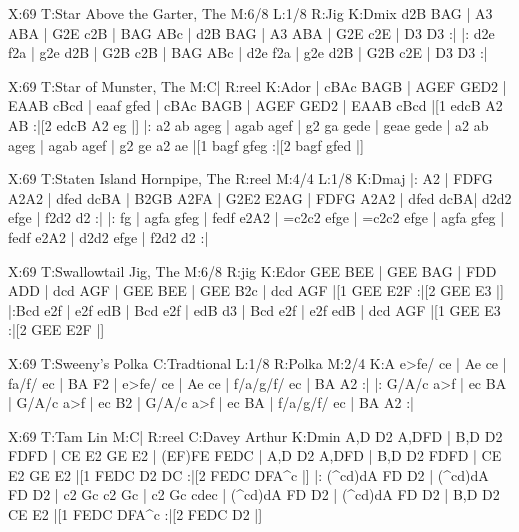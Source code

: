 \documentclass[letterpaper]{article}
\begin{document}
\begin{abc}[name]
X:69
T:Star Above the Garter, The
M:6/8
L:1/8
R:Jig
K:Dmix
d2B BAG | A3 ABA | G2E c2B | BAG ABc |
d2B BAG | A3 ABA | G2E c2E | D3 D3 :|
|: d2e f2a | g2e d2B | G2B c2B | BAG ABc |
d2e f2a | g2e d2B | G2B c2E | D3 D3 :|
\end{abc}

\begin{abc}[name]
X:69
T:Star of Munster, The
M:C|
R:reel
K:Ador
| cBAc BAGB | AGEF GED2 | EAAB cBcd | eaaf gfed |
cBAc BAGB | AGEF GED2 | EAAB cBcd |[1 edcB A2 AB :|[2 edcB A2 eg |]
|: a2 ab ageg | agab agef | g2 ga gede | geae gede |
a2 ab ageg | agab agef | g2 ge a2 ae |[1 bagf gfeg :|[2 bagf gfed |]
\end{abc}

\begin{abc}[name]
X:69
T:Staten Island Hornpipe, The
R:reel
M:4/4
L:1/8
K:Dmaj
|: A2 | FDFG A2A2 | dfed dcBA | B2GB A2FA | G2E2 E2AG |
FDFG A2A2 | dfed dcBA| d2d2 efge | f2d2 d2 :|
|: fg | agfa gfeg | fedf e2A2 | =c2c2 efge | =c2c2 efge |
agfa gfeg | fedf e2A2 | d2d2 efge | f2d2 d2 :|
\end{abc}

\begin{abc}[name]
X:69
T:Swallowtail Jig, The
M:6/8
R:jig
K:Edor
GEE BEE | GEE BAG | FDD ADD | dcd AGF |
GEE BEE | GEE B2c | dcd AGF |[1 GEE E2F :|[2 GEE E3 |]
|:Bcd e2f | e2f edB | Bcd e2f | edB d3 |
Bcd e2f | e2f edB | dcd AGF |[1 GEE E3 :|[2 GEE E2F |]
\end{abc}

\begin{abc}[name]
X:69
T:Sweeny's Polka
C:Tradtional
L:1/8
R:Polka
M:2/4
K:A
e>fe/ ce | Ae ce | fa/f/ ec | BA F2 |
e>fe/ ce | Ae ce | f/a/g/f/ ec | BA A2 :|
|: G/A/c a>f | ec BA | G/A/c a>f | ec B2 |
G/A/c a>f | ec BA | f/a/g/f/ ec | BA A2 :|
\end{abc}

\begin{abc}[name]
X:69
T:Tam Lin
M:C|
R:reel
C:Davey Arthur
K:Dmin
A,D D2 A,DFD | B,D D2 FDFD | CE E2 GE E2 | (EF)FE FEDC |
A,D D2 A,DFD | B,D D2 FDFD | CE E2 GE E2 |[1 FEDC D2 DC :|[2 FEDC DFA^c |]
|: (^cd)dA FD D2 | (^cd)dA FD D2 | c2 Gc c2 Gc | c2 Gc cdec |
(^cd)dA FD D2 | (^cd)dA FD D2 | B,D D2 CE E2 |[1 FEDC DFA^c :|[2 FEDC D2 |]
\end{abc}
\end{document}
